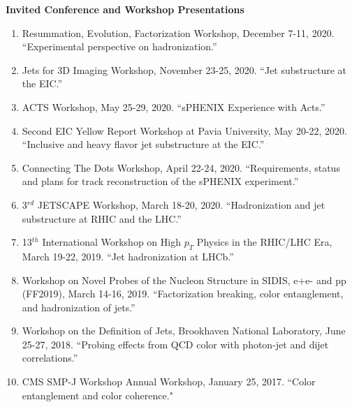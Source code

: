 \documentclass[11pt]{article}
\begin{document}
\begin{flushleft}
\Large\textbf{Invited Conference and Workshop Presentations}
\normalsize
\begin{enumerate}
	\item Resummation, Evolution, Factorization Workshop, December 7-11, 2020. ``Experimental perspective on hadronization.''
	\item Jets for 3D Imaging Workshop, November 23-25, 2020. ``Jet substructure at the EIC.''
	\item ACTS Workshop, May 25-29, 2020. ``sPHENIX Experience with Acts.''
	\item Second EIC Yellow Report Workshop at Pavia University, May 20-22, 2020. ``Inclusive and heavy flavor jet substructure at the EIC.''
	\item Connecting The Dots Workshop, April 22-24, 2020. ``Requirements, status and plans for track reconstruction of the sPHENIX experiment.''
	\item 3$^{rd}$ JETSCAPE Workshop, March 18-20, 2020. ``Hadronization and jet substructure at RHIC and the LHC.''
	\item 13$^{th}$ International Workshop on High $p_T$ Physics in the RHIC/LHC Era, March 19-22, 2019. ``Jet hadronization at LHCb.''
	\item Workshop on Novel Probes of the Nucleon Structure in SIDIS, e+e- and pp (FF2019), March 14-16, 2019. ``Factorization breaking, color entanglement, and hadronization of jets.''
	\item Workshop on the Definition of Jets, Brookhaven National Laboratory, June 25-27, 2018. ``Probing effects from QCD color with photon-jet and dijet correlations.''
	\item CMS SMP-J Workshop Annual Workshop, January 25, 2017. ``Color entanglement and color coherence."
\end{enumerate}
\end{flushleft}
\end{document}
